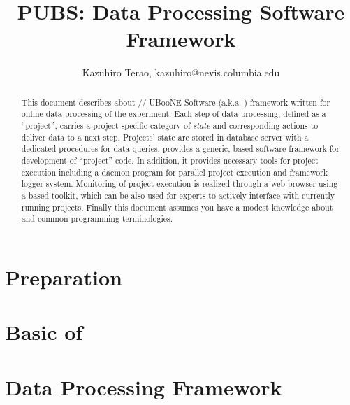 \documentclass[a4paper,12pt]{report}
\begin{document}
\title{PUBS: Data Processing Software Framework}
\author{
  Kazuhiro Terao, kazuhiro@nevis.columbia.edu
}
\maketitle

\begin{abstract}
This document describes about {\python/\php/\psql} UBooNE Software (a.k.a. \pubs) framework
written for online data processing of the experiment. Each step of data processing, defined
as a ``project'', carries a project-specific category of {\it state} and corresponding 
actions to deliver data to a next step. Projects' state are stored in {\psql} database server
with a dedicated procedures for data queries. {\pubs} provides a generic, {\python} based software 
framework for development of ``project'' code. In addition, it provides necessary tools for
project execution including a daemon program for parallel project execution and framework logger
system. Monitoring of project execution is realized through a web-browser using a {\php} based 
toolkit, which can be also used for experts to actively interface with currently running projects.
Finally this document assumes you have a modest knowledge about {\python} and common programming 
terminologies. 
\end{abstract}

\tableofcontents

\newpage

\chapter{Preparation}
\label{prep}


\chapter{Basic of {\pubs}}
\label{pubs}


\chapter{Data Processing Framework}
\label{dstream}





\end{document}
